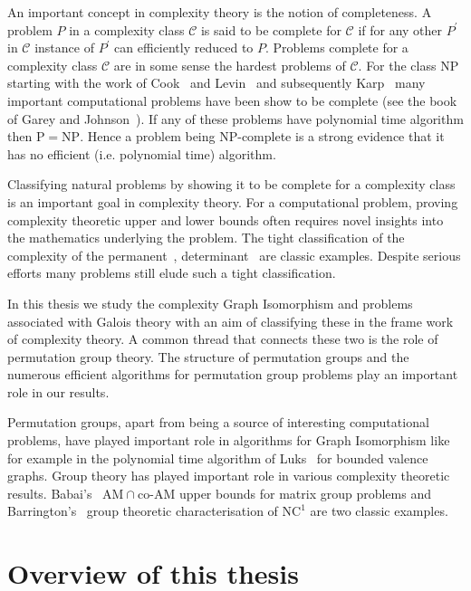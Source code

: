 \documentclass[11pt]{madras}%
\theoremstyle{remark}
\begin{document}
An important concept in complexity theory is the notion of
completeness. A problem $P$ in a complexity class $\mathcal{C}$ is
said to be complete for $\mathcal{C}$ if for any other $P^\prime$ in
$\mathcal{C}$ instance of $P^\prime$ can efficiently reduced to $P$.
Problems complete for a complexity class $\mathcal{C}$ are in some
sense the hardest problems of $\mathcal{C}$.  For the class
$\mathrm{NP}$ starting with the work of Cook~\cite{cook-sat} and
Levin~\cite{levin-np} and subsequently Karp~\cite{karp-np} many
important computational problems have been show to be complete (see
the book of Garey and Johnson~\cite{garey-johnson}). If any of these
problems have polynomial time algorithm then $\mathrm{P} =
\mathrm{NP}$. Hence a problem being $\mathrm{NP}$-complete is a strong
evidence that it has no efficient (i.e. polynomial time) algorithm.

Classifying natural problems by showing it to be complete for a
complexity class is an important goal in complexity theory.  For a
computational problem, proving complexity theoretic upper and lower
bounds often requires novel insights into the mathematics underlying
the problem. The tight classification of the complexity of the
permanent~\cite{valiant79permanent},
determinant~\cite{toda91determinant,vinay91pda} are classic examples.
Despite serious efforts many problems still elude such a tight
classification.

In this thesis we study the complexity Graph Isomorphism and problems
associated with Galois theory with an aim of classifying these in the
frame work of complexity theory. A common thread that connects these
two is the role of permutation group theory.  The structure of
permutation groups and the numerous efficient algorithms for
permutation group problems play an important role in our results.

Permutation groups, apart from being a source of interesting
computational problems, have played important role in algorithms for
Graph Isomorphism like for example in the polynomial time algorithm of
Luks~\cite{luks82bounded} for bounded valence graphs. Group theory has
played important role in various complexity theoretic results.
Babai's~\cite{babai92bounded} $\mathrm{AM}\cap
\textrm{co-}\mathrm{AM}$ upper bounds for matrix group problems and
Barrington's~\cite{barrington89boundedwidth} group theoretic
characterisation of $\mathrm{NC}^1$ are two classic examples.

\section{Overview of this thesis}
\end{document}
